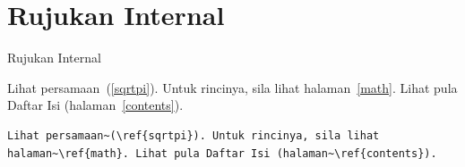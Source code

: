 \documentclass[11pt,            %
               aspectratio=169, %
               xcolor=svgnames,
               t                %
               ]{beamer}
\begin{document}
\section{Rujukan Internal}
\begin{frame}{Rujukan Internal}
\lipsum[3]

\bigskip

Lihat persamaan~(\ref{sqrtpi}). Untuk rincinya, sila lihat halaman~\ref{math}. Lihat pula Daftar Isi (halaman~\ref{contents}).

\begin{block}{}
\begin{verbatim}
Lihat persamaan~(\ref{sqrtpi}). Untuk rincinya, sila lihat
halaman~\ref{math}. Lihat pula Daftar Isi (halaman~\ref{contents}).
\end{verbatim}
\end{block}
\end{frame}

\end{document}
